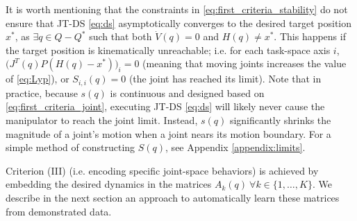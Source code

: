 \documentclass[letterpaper, 10 pt, conference,fleqn]{ieeeconf}
\begin{document}
It is worth mentioning that the constraints in \eqref{eq:first_criteria_stability}  do not ensure that JT-DS \eqref{eq:ds} asymptotically converges to the desired target position $x^*$, as $\exists q\in Q-Q^* $ such that both $\dot{V}(q)=0$ and $H(q) \neq x^*$. This happens if the target position is kinematically unreachable; i.e. for each task-space axis $i$,  $\big ( J^T(q)P(H(q)-x^*) \big)_i = 0 $ (meaning that moving joints increases the value of \eqref{eq:Lyp}), or $S_{i,i}(q) = 0$ (the joint has reached its limit).  Note that in practice, because $s(q)$ is continuous and designed based on \eqref{eq:first_criteria_joint}, executing JT-DS \eqref{eq:ds} will likely never cause the manipulator to reach the joint limit. Instead, $s(q)$ significantly shrinks the magnitude of a joint's motion when a joint nears its motion boundary. For a simple method of constructing $S(q)$, see Appendix \ref{appendix:limits}. 


Criterion (III) (i.e. encoding specific joint-space behaviors) is achieved by embedding the desired dynamics in the matrices $A_k(q)~ \forall k \in\{1,\dots,K\}$. We describe in the next section an approach to automatically learn these matrices from demonstrated data. 



\end{document}
